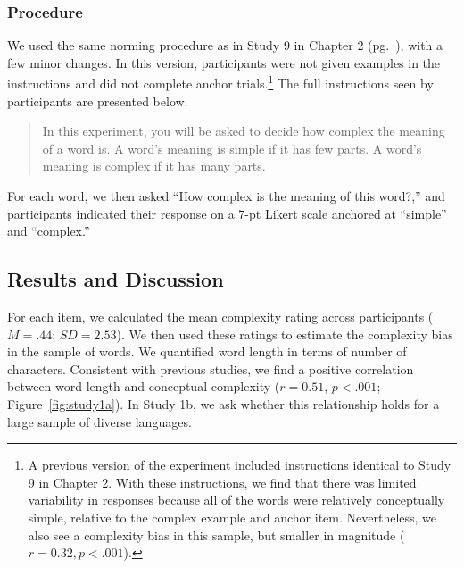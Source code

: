 \subsubsection{Procedure}
We used the same norming procedure as in Study 9 in Chapter 2 (pg.\ \pageref{ch2-9}), with a few minor changes. In this version, participants were not given examples in the instructions and did not complete anchor trials.\footnote{A previous version of the experiment included instructions identical to Study 9 in Chapter 2. With these instructions, we find that there was limited variability in responses because all of the words were relatively conceptually simple, relative to the complex example and anchor item. Nevertheless, we also see a complexity bias in this sample, but smaller in magnitude ($r=0.32, p<.001$).} The full instructions seen by participants are presented below.  
\begin{quote}
In this experiment, you will be asked to decide how complex the meaning of a word is. A word's meaning is simple if it has few parts. A word's meaning is complex if it has many parts.
\end{quote}
For each word, we then asked ``How complex is the meaning of this word?,'' and participants indicated their response on a 7-pt Likert scale anchored at ``simple'' and ``complex.''

\subsection{Results and Discussion}
For each item, we calculated the mean complexity rating across participants ($M = .44$; $SD = 2.53$). We then used these ratings to estimate the complexity bias in the sample of words. We quantified word length in terms of number of characters. Consistent with previous studies, we find a positive correlation between word length and conceptual complexity ($r=0.51$, $p<.001$; Figure\ \ref{fig:study1a}). In Study 1b, we ask whether this relationship holds for a large sample of diverse languages.

